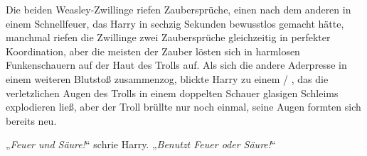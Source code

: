 Die beiden Weasley-Zwillinge riefen Zaubersprüche, einen nach dem anderen in einem Schnellfeuer, das Harry in sechzig Sekunden bewusstlos gemacht hätte, manchmal riefen die Zwillinge zwei Zaubersprüche gleichzeitig in perfekter Koordination, aber die meisten der Zauber lösten sich in harmlosen Funkenschauern auf der Haut des Trolls auf. Als sich die andere Aderpresse in einem weiteren Blutstoß zusammenzog, blickte Harry zu einem  / , das die verletzlichen Augen des Trolls in einem doppelten Schauer glasigen Schleims explodieren ließ, aber der Troll brüllte nur noch einmal, seine Augen formten sich bereits neu.

„\emph{Feuer und Säure!}“ schrie Harry. „\emph{Benutzt Feuer oder Säure!}“

